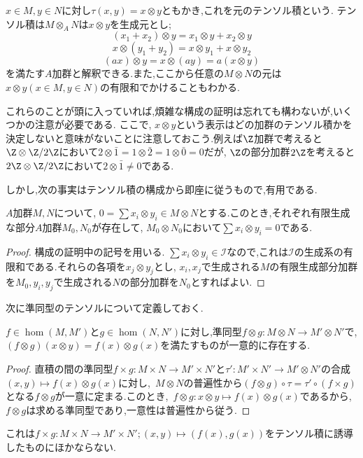 $x\in M,y\in N$に対し$\tau(x,y)=x\otimes y$ともかき,これを元のテンソル積という.
テンソル積は$M\otimes_A N$は$x\otimes y$を生成元とし;
\[(x_1+x_2)\otimes y=x_1\otimes y+x_2\otimes y\]
\[x\otimes(y_1+y_2)=x\otimes y_1+x\otimes y_2\]
\[(ax)\otimes y=x\otimes (ay)=a(x\otimes y)\]
を満たす$A$加群と解釈できる.また,ここから任意の$M\otimes N$の元は$x\otimes y (x\in M,y\in N)$の有限和でかけることもわかる.

これらのことが頭に入っていれば,煩雑な構成の証明は忘れても構わないが,いくつかの注意が必要である.
ここで, $x\otimes y$という表示はどの加群のテンソル積かを決定しないと意味がないことに注意しておこう.例えば$\Z$加群で考えると $\Z\otimes \Z/2\Z$において$2\otimes\bar{1}=1\otimes\bar{2}=1\otimes\bar{0}=0$だが, $\Z$の部分加群$2\Z$を考えると$2\Z\otimes\Z/2\Z$において$2\otimes\bar{1}\neq0$である.

しかし,次の事実はテンソル積の構成から即座に従うもので,有用である.

\begin{prop}\label{prop:テンソルの有限生成への制限}
	$A$加群$M,N$について, $0=\sum x_i\otimes y_i\in M\otimes N$とする.このとき,それぞれ有限生成な部分$A$加群$M_0,N_0$が存在して, $M_0\otimes N_0$において$\sum x_i\otimes y_i=0$である.
\end{prop}

\begin{proof}
	構成の証明中の記号を用いる. $\sum x_i\otimes y_i\in\mathcal{I}$なので,これは$\mathcal{I}$の生成系の有限和である.それらの各項を$x_j\otimes y_j$とし, $x_i,x_j$で生成される$M$の有限生成部分加群を$M_0, y_i,y_j$で生成される$N$の部分加群を$N_0$とすればよい.
\end{proof}

次に準同型のテンソルについて定義しておく.

\begin{prop}
	$f\in\hom(M,M')$と$g\in\hom(N,N')$に対し,準同型$f\otimes g:M\otimes N\to M'\otimes N'$で, $(f\otimes g)(x\otimes y)=f(x)\otimes g(x)$を満たすものが一意的に存在する.
\end{prop}
\begin{proof}
	直積の間の準同型$f\times g:M\times N\to M'\times N'$と$\tau':M'\times N'\to M'\otimes N'$の合成$(x,y)\mapsto f(x)\otimes g(x)$に対し,~$M\otimes N$の普遍性から$(f\otimes g)\circ\tau=\tau'\circ(f\times g)$となる$f\otimes g$が一意に定まる.このとき,~$f\otimes g:x\otimes y\mapsto f(x)\otimes g(x)$であるから,~$f\otimes g$は求める準同型であり,一意性は普遍性から従う.
\end{proof}
これは$f\times g:M\times N\to M'\times N';(x,y)\mapsto (f(x),g(x))$をテンソル積に誘導したものにほかならない.

